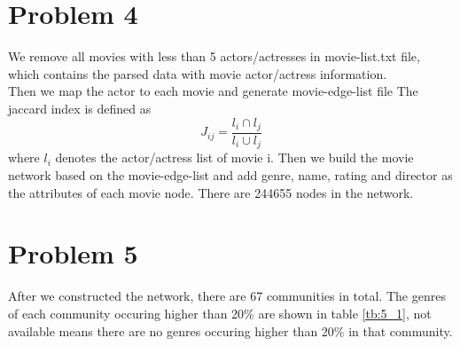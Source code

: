 \documentclass{article}
\begin{document}
\section{Problem 4}
We remove all movies with less than 5 actors/actresses in movie-list.txt file, which contains the parsed data with movie actor/actress information.\\
Then we map the actor to each movie and generate movie-edge-list file
The jaccard index is defined as $$J_{ij}=\frac{l_{i} \cap l_{j} }{l_{i}\cup l_{j}}$$
where $l_{i}$ denotes the actor/actress list of movie i.
Then we build the movie network based on the movie-edge-list and add genre, name, rating and director as the attributes of each movie node. There are 244655 nodes in the network.
\section{Problem 5}
After we constructed the network, there are 67 communities in total. The genres of each community occuring higher than 20\% are shown in table \ref{tb:5_1}, not available means there are no genres occuring higher than 20\% in that community.
\end{document}
